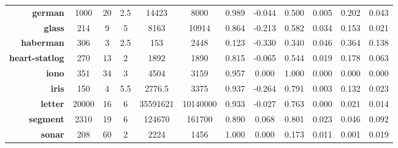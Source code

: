\begin{table}[ht!]
{\begin{tabular}{|r|ccccccccccc|}
    \textbf{german}        & 1000                & 20              & 2.5              & 14423               & 8000                & 0.989                    & -0.044            & 0.500        & 0.005               & 0.202               & 0.043               \\
    \textbf{glass}         & 214                 & 9               & 5                & 8163                & 10914               & 0.864                    & -0.213            & 0.582        & 0.034               & 0.153               & 0.021               \\
    \textbf{haberman}      & 306                 & 3               & 2.5              & 153                 & 2448                & 0.123                    & -0.330            & 0.340        & 0.046               & 0.364               & 0.138               \\
    \textbf{heart-statlog} & 270                 & 13              & 2                & 1892                & 1890                & 0.815                    & -0.065            & 0.544        & 0.019               & 0.178               & 0.063               \\
    \textbf{iono}          & 351                 & 34              & 3                & 4504                & 3159                & 0.957                    & 0.000             & 1.000        & 0.000               & 0.000               & 0.000               \\
    \textbf{iris}          & 150                 & 4               & 5.5              & 2776.5              & 3375                & 0.937                    & -0.264            & 0.791        & 0.003               & 0.132               & 0.023               \\
    \textbf{letter}        & 20000               & 16              & 6                & 35591621            & 10140000            & 0.933                    & -0.027            & 0.763        & 0.000               & 0.021               & 0.014               \\
    \textbf{segment}       & 2310                & 19              & 6                & 124670              & 161700              & 0.890                    & 0.068             & 0.801        & 0.023               & 0.046               & 0.092               \\
    \textbf{sonar}         & 208                 & 60              & 2                & 2224                & 1456                & 1.000                    & 0.000             & 0.173        & 0.011               & 0.001               & 0.019               \\

\end{tabular}}
\end{table}

